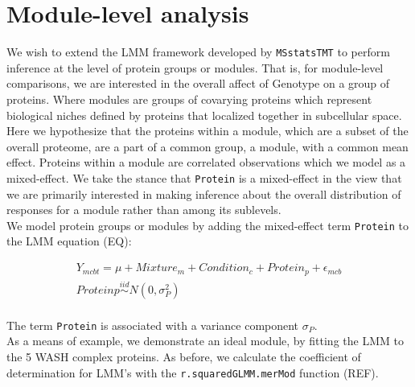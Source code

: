 \documentclass[11pt]{elife}\usepackage[]{graphicx}\usepackage[]{color}
\begin{document}
\section{Module-level analysis}

We wish to extend the LMM framework developed by \texttt{MSstatsTMT} to perform 
inference at the level of protein groups or modules.
That is, for module-level comparisons, we are interested in the overall affect 
of Genotype on a group of proteins. Where modules are groups of covarying 
proteins which represent biological niches defined by proteins that 
localized together in subcellular space.\\

Here we hypothesize that the proteins within a module, which are a subset of 
the overall proteome,  are a part of a common group, a module, with a common 
mean effect. Proteins within a module are correlated observations 
which we model as a mixed-effect. 
We take the stance that \texttt{Protein} is a mixed-effect 
in the view that we are primarily interested in making inference about the 
overall distribution of responses for a module rather than among its sublevels.\\

We model protein groups or modules by adding the mixed-effect term
\texttt{Protein} to the LMM equation (EQ):

\begin{equation} 
  \begin{gathered}
	Y_{mcbt} = \mu + Mixture_m + Condition_c + Protein_p + \epsilon_{mcb}\\
	Protein{p} \stackrel{iid}{\sim} N(0,\sigma^2_P) \\
  \end{gathered}
\end{equation}

The term \texttt{Protein} is associated with a variance component $\sigma_P$.\\

As a means of example, we demonstrate an ideal module, by fitting the LMM to 
the 5 WASH complex proteins. As before, we calculate the coefficient of 
determination for LMM's with the \texttt{r.squaredGLMM.merMod} function
(REF).
\end{document}
